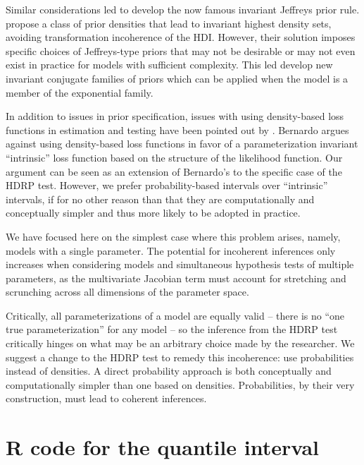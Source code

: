 \documentclass[man]{apa}
\newcommand{\hdr}{HDRP}
\begin{document}
Similar considerations led  to develop the now famous invariant Jeffreys prior rule.  propose a class of prior densities that lead to invariant highest density sets, avoiding transformation incoherence of the HDI. However, their solution imposes specific choices of Jeffreys-type priors that may not be desirable or may not even exist in practice for models with sufficient complexity. This led  develop new invariant conjugate families of priors which can be applied when the model is a member of the exponential family. 

In addition to issues in prior specification, issues with using density-based loss functions in estimation and testing have been pointed out by . Bernardo argues against using density-based loss functions in favor of a parameterization invariant ``intrinsic'' loss function based on the structure of the likelihood function. Our argument can be seen as an extension of Bernardo's to the specific case of the \hdr{} test. However, we prefer probability-based intervals over ``intrinsic'' intervals, if for no other reason than that they are computationally and conceptually simpler and thus more likely to be adopted in practice. 

We have focused here on the simplest case where this problem arises, namely, models with a single parameter. The potential for incoherent inferences only increases when considering models and simultaneous hypothesis tests of multiple parameters, as the multivariate Jacobian term must account for stretching and scrunching across all dimensions of the parameter space. 

Critically, all parameterizations of a model are equally valid -- there is no ``one true parameterization'' for any model -- so the inference from the \hdr{} test critically hinges on what may be an arbitrary choice made by the researcher. We suggest a change to the \hdr{} test to remedy this incoherence: use probabilities instead of densities. A direct probability approach is both conceptually and computationally simpler than one based on densities. Probabilities, by their very construction, must lead to coherent inferences. 







\null

\appendix
\section{R code for the quantile interval}
\end{document}
